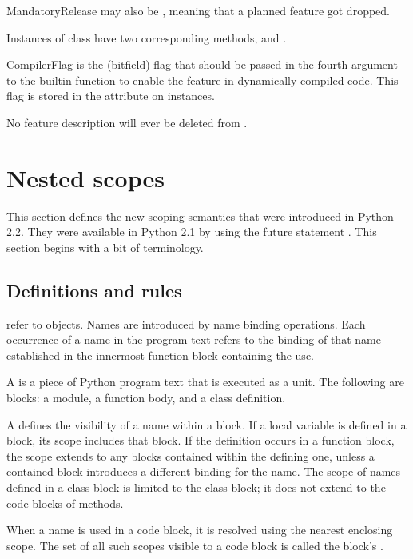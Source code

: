 MandatoryRelease may also be , meaning that a planned
feature got dropped.

Instances of class  have two corresponding methods,
 and .

CompilerFlag is the (bitfield) flag that should be passed in the
fourth argument to the builtin function  to enable
the feature in dynamically compiled code.  This flag is stored in the
 attribute on  instances.

No feature description will ever be deleted from .

\section{Nested scopes \label{nested-scopes}}

This section defines the new scoping semantics that were introduced
in Python 2.2.  They were available in Python 2.1 by using the future
statement .  This section begins with a bit of
terminology.

\subsection{Definitions and rules \label{definitions}}

 refer to objects.  Names are introduced by name binding
operations.  Each occurrence of a name in the program text refers to
the binding of that name established in the innermost function block
containing the use.

A  is a piece of Python program text that is executed as
a unit.  The following are blocks: a module, a function body, and a
class definition.

A  defines the visibility of a name within a block.  If a
local variable is defined in a block, its scope includes that block.
If the definition occurs in a function block, the scope extends to any
blocks contained within the defining one, unless a contained block
introduces a different binding for the name.  The scope of names
defined in a class block is limited to the class block; it does not
extend to the code blocks of methods.

When a name is used in a code block, it is resolved using the nearest
enclosing scope.  The set of all such scopes visible to a code block
is called the block's .  

